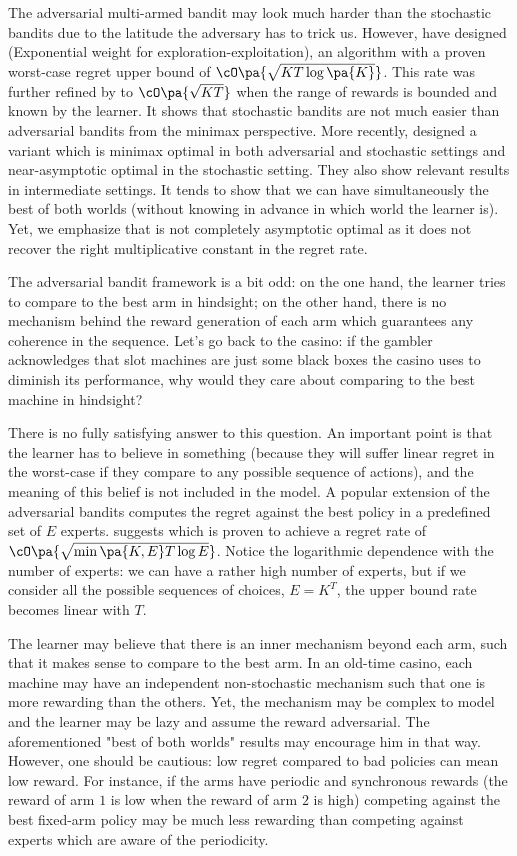 {The adversarial multi-armed bandit may look much harder than the stochastic bandits due to the latitude the adversary has to trick us. However, \citet{auer2002nonstochastic} have designed \EXP (Exponential weight for exploration-exploitation), an algorithm with a proven worst-case regret upper bound of $\cO\pa{\sqrt{KT\log\pa{K}}}$. This rate was further refined by \INF \citep{audibert2009minimax} to $\cO\pa{\sqrt{KT}}$ when the range of rewards is bounded and known by the learner. It shows that stochastic bandits are not much easier than adversarial bandits from the minimax perspective. More recently, \citet{zimmert2018tsallis} designed a variant \TsallisINF which is minimax optimal in both adversarial and stochastic settings and near-asymptotic optimal in the stochastic setting. They also show relevant results in intermediate settings. It tends to show that we can have simultaneously the best of both worlds (without knowing in advance in which world the learner is).  Yet, we emphasize that \TsallisINF is not completely asymptotic optimal as it does not recover the right multiplicative constant in the regret rate. 

The adversarial bandit framework is a bit odd: on the one hand, the learner tries to compare to the best arm in hindsight; on the other hand, there is no mechanism behind the reward generation of each arm which guarantees any coherence in the sequence. Let's go back to the casino: if the gambler acknowledges that slot machines are just some black boxes the casino uses to diminish its performance, why would they care about comparing to the best machine in hindsight? 

There is no fully satisfying answer to this question. An important point is that the learner has to believe in something (because they will suffer linear regret in the worst-case if they compare to any possible sequence of actions), and the meaning of this belief is not included in the model. A popular extension of the adversarial bandits computes the regret against the best policy in a predefined set of $E$ experts.  \citet{auer2002nonstochastic} suggests \EXPfour which is proven to achieve a regret rate of $\cO\pa{\sqrt{\min\pa{K, E} T\log E}}$. Notice the logarithmic dependence with the number of experts: we can have a rather high number of experts, but if we consider all the possible sequences of choices, \ie $ E = K^T$, the upper bound rate becomes linear with $T$. 

The learner may believe that there is an inner mechanism beyond each arm, such that it makes sense to compare to the best arm. In an old-time casino, each machine may have an independent non-stochastic mechanism such that one is more rewarding than the others. Yet, the mechanism may be complex to model and the learner may be lazy and assume the reward adversarial. The aforementioned "best of both worlds" results may encourage him in that way. However, one should be cautious: low regret compared to bad policies can mean low reward. For instance, if the arms have periodic and synchronous rewards (the reward of arm $1$ is low when the reward of arm $2$ is high) competing against the best fixed-arm policy may be much less rewarding than competing against experts which are aware of the periodicity.


}
